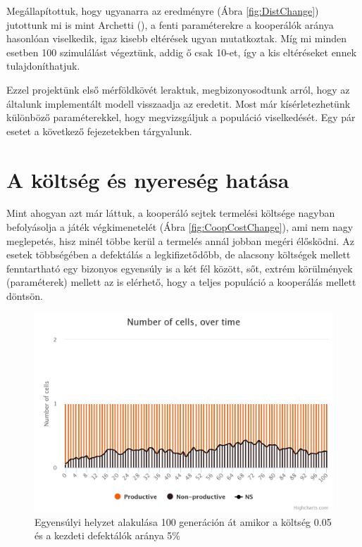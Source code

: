 Megállapítottuk, hogy ugyanarra az eredményre (Ábra \ref{fig:DistChange}) jutottunk mi is mint Archetti (\cite{archetti2016cooperation}), a fenti paraméterekre a kooperálók aránya hasonlóan viselkedik, igaz kisebb eltérések ugyan mutatkoztak. Míg mi minden esetben 100 szimulálást végeztünk, addig ő csak 10-et, így a kis eltéréseket ennek tulajdoníthatjuk.

Ezzel projektünk első mérföldkövét leraktuk, megbizonyosodtunk arról, hogy az általunk implementált modell visszaadja az eredetit. Most már kísérletezhetünk különböző paraméterekkel, hogy megvizsgáljuk a populáció viselkedését. Egy pár esetet a következő fejezetekben tárgyalunk.

\section{A költség és nyereség hatása}

Mint ahogyan azt már láttuk, a kooperáló sejtek termelési költsége nagyban befolyásolja a játék végkimenetelét (Ábra \ref{fig:CoopCostChange}), ami nem nagy meglepetés, hisz minél többe kerül a termelés annál jobban megéri élősködni. Az esetek többségében a defektálás a legkifizetődőbb, de alacsony költségek mellett fenntartható egy bizonyos egyensúly is a két fél között, sőt, extrém körülmények (paraméterek) mellett az is elérhető, hogy a teljes populáció a kooperálás mellett döntsön. 

\begin{figure}[ht!]
	\centering
	\includegraphics[width=0.9\linewidth]{images/egyensuly}
	\captionsetup{justification=centering}
	\caption{Egyensúlyi helyzet alakulása 100 generáción át amikor a költség 0.05 és a kezdeti defektálók aránya 5\%}
	\label{fig:egyensuly}
\end{figure}

